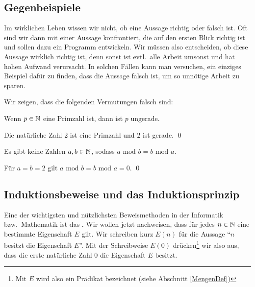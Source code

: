 \subsection{Gegenbeispiele}
Im wirklichen Leben wissen wir nicht, ob eine Aussage richtig oder
falsch ist. Oft sind wir dann mit einer Aussage konfrontiert, die auf
den ersten Blick richtig ist und sollen dazu ein Programm
entwickeln. Wir müssen also entscheiden, ob diese Aussage wirklich
richtig ist, denn sonst ist evtl.~alle Arbeit umsonst und hat hohen
Aufwand verursacht. In solchen Fällen kann man versuchen, ein einziges
Beispiel dafür zu finden, dass die Aussage falsch ist, um so unnötige
Arbeit zu sparen.

\bigskip

\noindent Wir zeigen, dass die folgenden Vermutungen falsch sind:
\begin{conjecture}
Wenn $p \in \mathbb N$ eine Primzahl ist, dann ist $p$ ungerade.
\end{conjecture}

\begin{counterexample}
Die natürliche Zahl 2 ist eine Primzahl und $2$ ist gerade. \qed
\end{counterexample}

\begin{conjecture}
Es gibt keine Zahlen $a,b \in \mathbb N$, sodass $a \textrm{ mod } b = b
\textrm{ mod } a$.
\end{conjecture}

\begin{counterexample}
Für $a = b = 2$ gilt $a \textrm{ mod } b = b \textrm{ mod } a = 0$. \qed
\end{counterexample}

\subsection{Induktionsbeweise und das Induktionsprinzip}
Eine der wichtigsten und nützlichsten Beweismethoden in der Informatik bzw.~Mathematik
ist das . Wir wollen jetzt nachweisen, dass
für jedes $n \in \mathbb N$ eine bestimmte Eigenschaft $E$ gilt. Wir
schreiben kurz $E(n)$ für die Aussage "`$n$ besitzt die Eigenschaft
$E$"'. Mit der Schreibweise $E(0)$ drücken\footnote{Mit $E$ wird also
ein Prädikat bezeichnet (siehe Abschnitt \ref{MengenDef})} wir also
aus, dass die erste natürliche Zahl $0$ die Eigenschaft $E$ besitzt.

